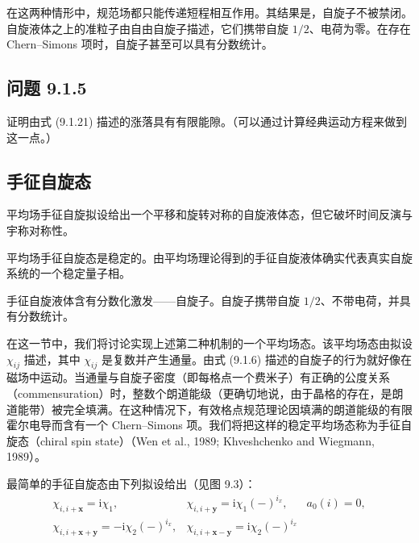 在这两种情形中，规范场都只能传递短程相互作用。其结果是，自旋子不被禁闭。自旋液体之上的准粒子由自由自旋子描述，它们携带自旋 $1/2$、电荷为零。在存在 Chern--Simons 项时，自旋子甚至可以具有分数统计。


\subsection*{问题 9.1.5}

证明由式 (9.1.21) 描述的涨落具有有限能隙。（可以通过计算经典运动方程来做到这一点。）

\subsection{手征自旋态}

\begin{keypoints}
\item 平均场手征自旋拟设给出一个平移和旋转对称的自旋液体态，但它破坏时间反演与宇称对称性。
\item 平均场手征自旋态是稳定的。由平均场理论得到的手征自旋液体确实代表真实自旋系统的一个稳定量子相。
\item 手征自旋液体含有分数化激发——自旋子。自旋子携带自旋 $1/2$、不带电荷，并具有分数统计。
\end{keypoints}

在这一节中，我们将讨论实现上述第二种机制的一个平均场态。该平均场态由拟设 $\chi_{ij}$ 描述，其中 $\chi_{ij}$ 是复数并产生通量。由式 (9.1.6) 描述的自旋子的行为就好像在磁场中运动。当通量与自旋子密度（即每格点一个费米子）有正确的公度关系（commensuration）时，整数个朗道能级（更确切地说，由于晶格的存在，是朗道能带）被完全填满。在这种情况下，有效格点规范理论因填满的朗道能级的有限霍尔电导而含有一个 Chern--Simons 项。我们将把这样的稳定平均场态称为手征自旋态（chiral spin state）（Wen et al., 1989; Khveshchenko and Wiegmann, 1989）。

最简单的手征自旋态由下列拟设给出（见图 9.3）：
\begin{equation*}
\begin{array}{lll}
\chi_{i,i+\pmb{x}}=\mathrm{i}\chi_1, & \chi_{i,i+\pmb{y}}=\mathrm{i}\chi_1(-)^{i_x}, & a_0(i)=0,\\[2pt]
\chi_{i,i+\pmb{x}+\pmb{y}}=-\mathrm{i}\chi_2(-)^{i_x}, & \chi_{i,i+\pmb{x}-\pmb{y}}=\mathrm{i}\chi_2(-)^{i_x} &
\end{array}
\tag{9.1.22}
\end{equation*}

